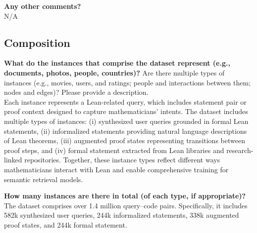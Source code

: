     \textcolor{\sectioncolor}{\textbf{Any other comments?
    }} \\
    N/A \\

\subsection{Composition}
    \textcolor{\sectioncolor}{\textbf{What do the instances that comprise the dataset represent (e.g., documents,
    photos, people, countries)?
    }
    Are there multiple types of instances (e.g., movies, users, and ratings;
    people and interactions between them; nodes and edges)? Please provide a
    description.
    } \\
Each instance represents a Lean-related query, which includes statement pair or proof context designed to capture mathematicians’ intents. The dataset includes multiple types of instances: (i) synthesized user queries grounded in formal Lean statements, (ii) informalized statements providing natural language descriptions of Lean theorems, (iii) augmented proof states representing transitions between proof steps, and (iv) formal statement extracted from Lean libraries and research-linked repositories. Together, these instance types reflect different ways mathematicians interact with Lean and enable comprehensive training for semantic retrieval models.

    
    \textcolor{\sectioncolor}{\textbf{How many instances are there in total (of each type, if appropriate)?
    }
    } \\
The dataset comprises over 1.4 million query–code pairs. Specifically, it includes 582k synthesized user queries, 244k informalized statements, 338k augmented proof states, and 244k formal statement.


